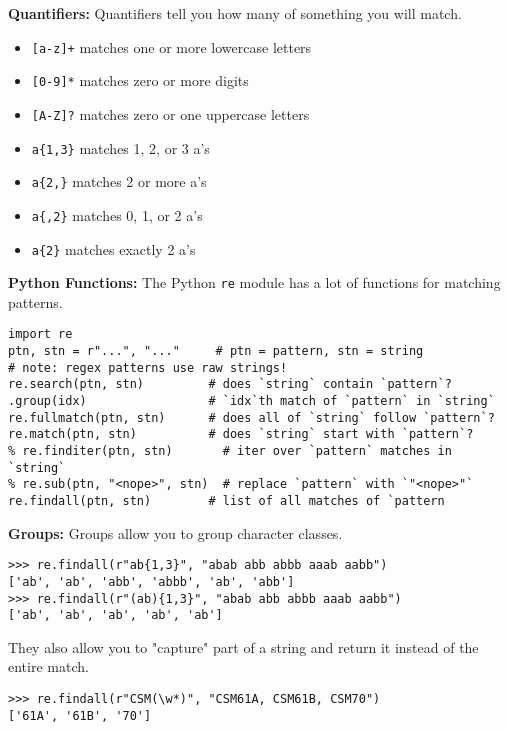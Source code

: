 \textbf{Quantifiers:}
Quantifiers tell you how many of something you will match.
\begin{itemize}
    \item \lstinline$[a-z]+$ matches one or more lowercase letters
    \item \lstinline$[0-9]*$ matches zero or more digits
    \item \lstinline$[A-Z]?$ matches zero or one uppercase letters
    \item \lstinline$a{1,3}$ matches 1, 2, or 3 a's
    \item \lstinline$a{2,}$ matches 2 or more a's
    \item \lstinline$a{,2}$ matches 0, 1, or 2 a's
    \item \lstinline$a{2}$ matches exactly 2 a's
\end{itemize}

\textbf{Python Functions:}
The Python \lstinline$re$ module has a lot of functions for matching patterns.

\begin{lstlisting}
import re
ptn, stn = r"...", "..."     # ptn = pattern, stn = string
# note: regex patterns use raw strings!
re.search(ptn, stn)         # does `string` contain `pattern`?
.group(idx)                 # `idx`th match of `pattern` in `string`
re.fullmatch(ptn, stn)      # does all of `string` follow `pattern`?
re.match(ptn, stn)          # does `string` start with `pattern`?
% re.finditer(ptn, stn)       # iter over `pattern` matches in `string`
% re.sub(ptn, "<nope>", stn)  # replace `pattern` with `"<nope>"`
re.findall(ptn, stn)        # list of all matches of `pattern
\end{lstlisting}

\textbf{Groups:}
Groups allow you to group character classes.
\begin{lstlisting}
>>> re.findall(r"ab{1,3}", "abab abb abbb aaab aabb")
['ab', 'ab', 'abb', 'abbb', 'ab', 'abb']
>>> re.findall(r"(ab){1,3}", "abab abb abbb aaab aabb")
['ab', 'ab', 'ab', 'ab', 'ab']
\end{lstlisting}
They also allow you to "capture" part of a string and return it instead of the entire match.
\begin{lstlisting}
>>> re.findall(r"CSM(\w*)", "CSM61A, CSM61B, CSM70")
['61A', '61B', '70']
\end{lstlisting}

